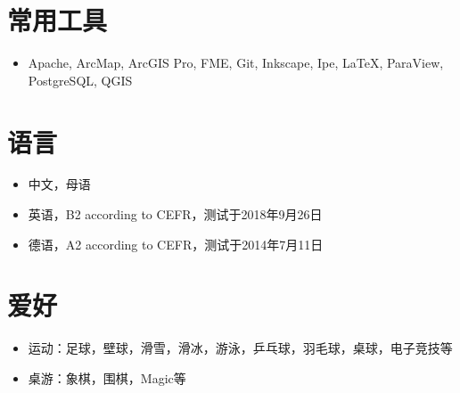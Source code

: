 \documentclass{resume}
\begin{document}
\section{常用工具}
\begin{itemize}[parsep=0ex]
\item Apache, ArcMap, ArcGIS Pro, FME, Git, Inkscape, Ipe, 
    LaTeX, ParaView, PostgreSQL, QGIS
\end{itemize}

\section{语言}
\begin{itemize}[parsep=0ex]
\item 中文，母语
\item 英语，B2 according to CEFR\footnotemark，测试于2018年9月26日
\item 德语，A2 according to CEFR，测试于2014年7月11日
\end{itemize}

\section{爱好}
\begin{itemize}[parsep=0ex]
\item 运动：足球，壁球，滑雪，滑冰，游泳，乒乓球，羽毛球，桌球，电子竞技等
\item 桌游：象棋，围棋，Magic等
\end{itemize}
\end{document}

